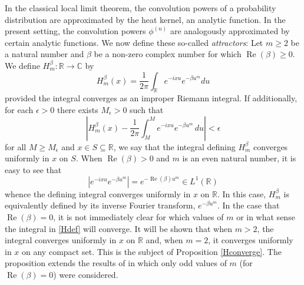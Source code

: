 \documentclass{article}
\theoremstyle{theorem}
\theoremstyle{remark}
\renewcommand\Re{\operatorname{Re}}%
\begin{document}
\noindent In the classical local limit theorem, the convolution powers of a
probability distribution are approximated by the heat kernel, an analytic
function. In the present setting, the convolution
powers $\phi^{(n)}$ are analogously approximated by certain analytic
functions. We now define these so-called \emph{attractors}: Let $m\geq 2$ be a natural
number and $\beta$ be a non-zero complex number for which $\Re(\beta)\geq 0$. We define $H_m^{\beta}:\mathbb{R}\rightarrow\mathbb{C}$ by
\begin{equation}\label{Hdef}
H_m^{\beta}(x)=\frac{1}{2\pi}\int_{\mathbb{R}}e^{-i xu}e^{-\beta u^m}du
\end{equation}
provided the integral converges as an improper Riemann integral. If additionally, for each $\epsilon>0$ there exists $M_\epsilon>0$ such that
\begin{equation*}
\left|H_m^{\beta}(x)-\frac{1}{2\pi}\int_M^Me^{-ixu}e^{-\beta u^m}\,du\right|<\epsilon
\end{equation*}
for all $M\geq M_\epsilon$ and $x\in S\subseteq\mathbb{R}$, we say that the integral defining $H_m^{\beta}$ converges uniformly in $x$ on $S$. When $\Re(\beta)>0$  and $m$ is an even natural number, it is easy to see that 
\begin{equation*}
 |e^{-i xu}e^{-\beta u^m}|= e^{-\Re(\beta)u^m}\in L^1(\mathbb{R})
\end{equation*}
whence the defining integral converges uniformly in $x$ on $\mathbb{R}$. In this case, $H_m^{\beta}$ is equivalently defined by its inverse Fourier transform, $e^{-\beta u^m}$. In the case that $\Re(\beta)=0$, it is not immediately clear for which values of $m$ or in what sense the integral in \eqref{Hdef} will converge. It will be shown that when $m>2$, the integral converges uniformly in $x$ on $\mathbb{R}$ and, when $m=2$, it converges uniformly in $x$ on any compact set. This is the subject of Proposition \ref{Hconverge}. The proposition extends the results of \cite{TNEG} in which only odd values of $m$ (for $\Re(\beta)=0$) were considered. \\
\end{document}

